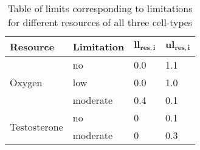 \begin{table}
\centering
  \begin{tabular}{|l|l|l|l|}
    \hline
    \textbf{Resource} & \textbf{Limitation} & \textbf{$\boldsymbol{ll_{res,i}}$} & \textbf{$\boldsymbol{ul_{res,i}}$} \\ \hline
    \multirow{3}{*}{Oxygen} & no & 0.0 & 1.1 \\ \cline{2-4}
    & low & 0.0 & 1.0 \\ \cline{2-4}
    & moderate & 0.4 & 0.1 \\ \hline
    \multirow{3}{*}{Testosterone} & no & 0 & 0.1 \\ \cline{2-4}
    & moderate & 0 & 0.3 \\ \hline
  \end{tabular}
  \caption[Table of resource limitations for all cell types]{Table of limits corresponding to limitations for different resources of all three cell-types}
  \label{tab_all3_limits}
\end{table}

\newpage

